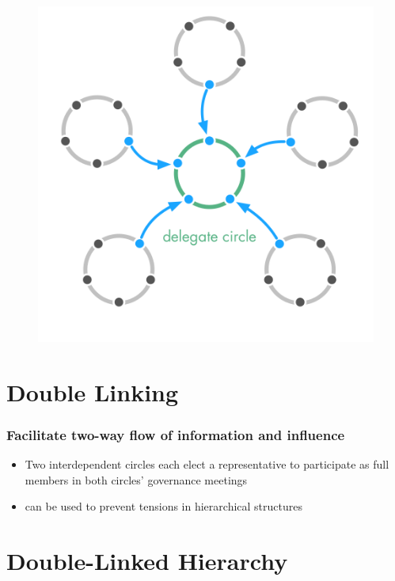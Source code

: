 \begin{figure}[htbp]
\centering
\includegraphics[keepaspectratio,width=\textwidth,height=0.75\textheight]{img/structural-patterns/delegate-circle.png}
\end{figure}

\section{Double Linking}
\label{doublelinking}

\subsubsection{Facilitate two-way flow of information and influence}
\label{facilitatetwo-wayflowofinformationandinfluence}

\begin{itemize}
\item Two interdependent circles each elect a representative to participate as full members in both circles' governance meetings

\item can be used to prevent tensions in hierarchical structures

\end{itemize}

\section{Double-Linked Hierarchy}
\label{double-linkedhierarchy}

